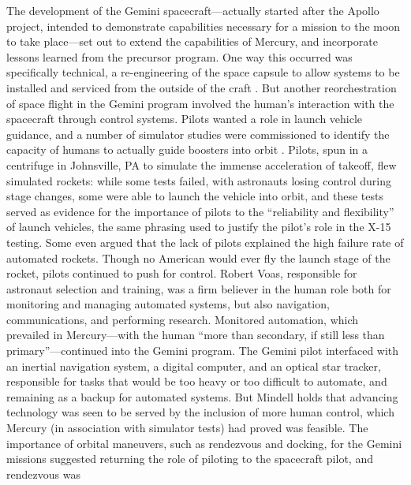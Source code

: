 
The development of the Gemini spacecraft---actually started after the
Apollo project, intended to demonstrate capabilities necessary for
a mission to the moon to take place---set out to extend the
capabilities of Mercury, and incorporate lessons learned from the
precursor program. One way this occurred was specifically technical, a
re-engineering of the space capsule to allow systems to be installed
and serviced from the outside of the craft \cite{???}. But another
reorchestration of space flight in the Gemini program involved the
human's interaction with the spacecraft through control systems.
Pilots wanted a role in launch vehicle guidance, and a number of
simulator studies were commissioned to identify the capacity of humans to
actually guide boosters into orbit \cite{???}. Pilots, spun in a
centrifuge in Johnsville, PA to simulate the immense acceleration of
takeoff, flew
simulated rockets: while some tests failed, with astronauts losing
control during stage changes, some were able to launch the vehicle
into orbit, and these tests served as evidence for the importance of
pilots to the ``reliability and flexibility'' of launch vehicles,
the same phrasing used to justify the pilot's role in the X-15
testing\cite[p. 72]{???-DM}. Some even argued that the lack of pilots
explained the high failure rate of automated rockets\cite[p.
  73]{???-DM}. Though no American would ever fly the launch stage of
the rocket, pilots continued to push for control. Robert Voas,
responsible for astronaut selection and training, was a firm believer
in the human role both for monitoring and managing automated systems,
but also 
navigation, communications, and performing research\cite[p.
  77]{???-DM}. Monitored automation, which prevailed in Mercury---with
the human ``more than secondary, if still less than primary''\cite[p.
  77]{???-DM}---continued into the Gemini program. The Gemini pilot
interfaced with an inertial navigation system, a digital computer, and
an optical star tracker, responsible for tasks that would be too heavy
or too difficult to automate, and remaining as a backup for automated
systems\cite[p. 83]{???-DM}. But Mindell holds that advancing
technology was seen to be served by the inclusion of more human
control, which Mercury (in association with simulator tests) had proved was
feasible\cite[p. 84]{???-DM}. The importance of orbital maneuvers,
 such as rendezvous and docking, for the Gemini missions suggested returning
the role of piloting to the spacecraft pilot, and rendezvous was
